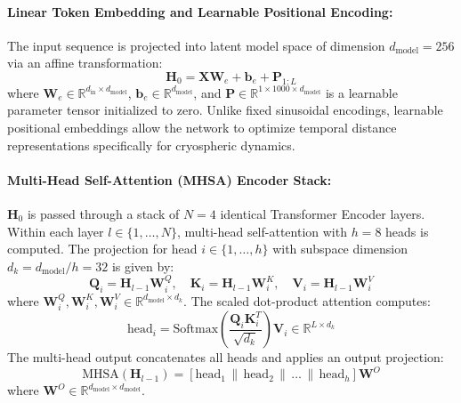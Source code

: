 \documentclass{mnnit}
\begin{document}
\paragraph{Linear Token Embedding and Learnable Positional Encoding:}
The input sequence is projected into latent model space of dimension $d_{\text{model}} = 256$ via an affine transformation:
\begin{equation}
    \mathbf{H}_0 = \mathbf{X} \mathbf{W}_e + \mathbf{b}_e + \mathbf{P}_{1:L}
\end{equation}
where $\mathbf{W}_e \in \mathbb{R}^{d_{\text{in}} \times d_{\text{model}}}$, $\mathbf{b}_e \in \mathbb{R}^{d_{\text{model}}}$, and $\mathbf{P} \in \mathbb{R}^{1 \times 1000 \times d_{\text{model}}}$ is a learnable parameter tensor initialized to zero. Unlike fixed sinusoidal encodings, learnable positional embeddings allow the network to optimize temporal distance representations specifically for cryospheric dynamics.

\paragraph{Multi-Head Self-Attention (MHSA) Encoder Stack:}
$\mathbf{H}_0$ is passed through a stack of $N = 4$ identical Transformer Encoder layers. Within each layer $l \in \{1, \dots, N\}$, multi-head self-attention with $h = 8$ heads is computed. The projection for head $i \in \{1, \dots, h\}$ with subspace dimension $d_k = d_{\text{model}} / h = 32$ is given by:
\begin{equation}
    \mathbf{Q}_i = \mathbf{H}_{l-1} \mathbf{W}_i^Q, \quad \mathbf{K}_i = \mathbf{H}_{l-1} \mathbf{W}_i^K, \quad \mathbf{V}_i = \mathbf{H}_{l-1} \mathbf{W}_i^V
\end{equation}
where $\mathbf{W}_i^Q, \mathbf{W}_i^K, \mathbf{W}_i^V \in \mathbb{R}^{d_{\text{model}} \times d_k}$. The scaled dot-product attention computes:
\begin{equation}
    \text{head}_i = \text{Softmax}\left(\frac{\mathbf{Q}_i \mathbf{K}_i^T}{\sqrt{d_k}}\right) \mathbf{V}_i \in \mathbb{R}^{L \times d_k}
\end{equation}
The multi-head output concatenates all heads and applies an output projection:
\begin{equation}
    \text{MHSA}(\mathbf{H}_{l-1}) = \left[\text{head}_1 \,\|\, \text{head}_2 \,\|\, \dots \,\|\, \text{head}_h \right] \mathbf{W}^O
\end{equation}
where $\mathbf{W}^O \in \mathbb{R}^{d_{\text{model}} \times d_{\text{model}}}$.
\end{document}
